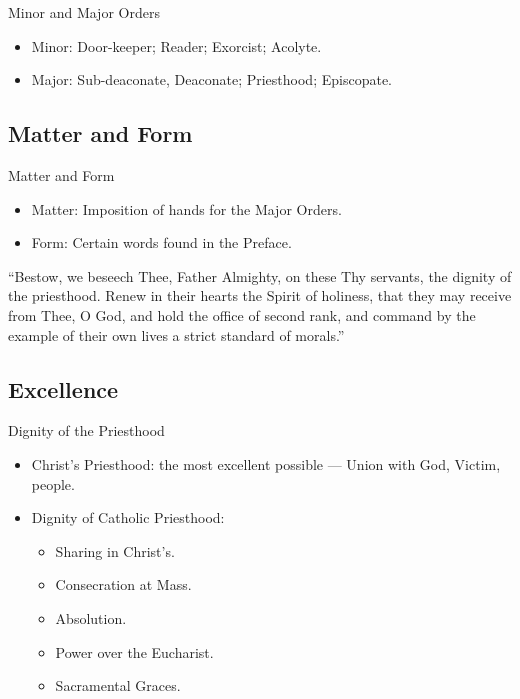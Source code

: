 \documentclass{beamer}
\begin{document}
\begin{frame}{Minor and Major Orders}
\begin{itemize}
 \item Minor: Door-keeper; Reader; Exorcist; Acolyte.
 \item Major: Sub-deaconate, Deaconate; Priesthood; Episcopate.
\end{itemize}
\end{frame}

\subsection{Matter and Form}

\begin{frame}{Matter and Form}
\begin{itemize}
 \item Matter: Imposition of hands for the Major Orders.
 \item Form: Certain words found in the Preface.
\end{itemize}
``Bestow, we beseech Thee,  Father  Almighty,
on these Thy servants, the dignity of the priesthood. Renew in their  hearts
the Spirit of holiness, that they may receive from Thee,  O  God,  and  hold
the office of second rank, and command by the example of their own  lives  a
strict standard of morals.''
\end{frame}

\subsection{Excellence}

\begin{frame}{Dignity of the Priesthood}
\begin{itemize}
 \item    Christ's Priesthood: the most excellent possible --- Union with God, Victim, people.
 \item    Dignity of Catholic Priesthood:
\begin{itemize}
      \item Sharing in Christ's.
      \item Consecration at Mass.
      \item Absolution.
      \item Power over the Eucharist.
      \item Sacramental Graces.
\end{itemize}
\end{itemize}
\end{frame}
\end{document}
